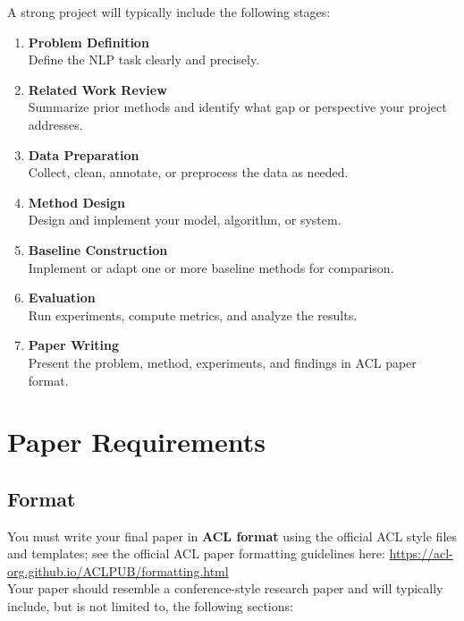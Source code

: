 \documentclass{article}
\begin{document}
A strong project will typically include the following stages:

\begin{enumerate}[label=\arabic*.]
  \item \textbf{Problem Definition} \\
  Define the NLP task clearly and precisely.

  \item \textbf{Related Work Review} \\
  Summarize prior methods and identify what gap or perspective your project addresses.

  \item \textbf{Data Preparation} \\
  Collect, clean, annotate, or preprocess the data as needed.

  \item \textbf{Method Design} \\
  Design and implement your model, algorithm, or system.

  \item \textbf{Baseline Construction} \\
  Implement or adapt one or more baseline methods for comparison.

  \item \textbf{Evaluation} \\
  Run experiments, compute metrics, and analyze the results.

  \item \textbf{Paper Writing} \\
  Present the problem, method, experiments, and findings in ACL paper format.
\end{enumerate}

\section{Paper Requirements}

\subsection{Format}

You must write your final paper in \textbf{ACL format} using the official ACL style files and templates; see the official ACL paper formatting guidelines here: \url{https://acl-org.github.io/ACLPUB/formatting.html} \\

\noindent Your paper should resemble a conference-style research paper and will typically include, but is not limited to, the following sections:
\end{document}
